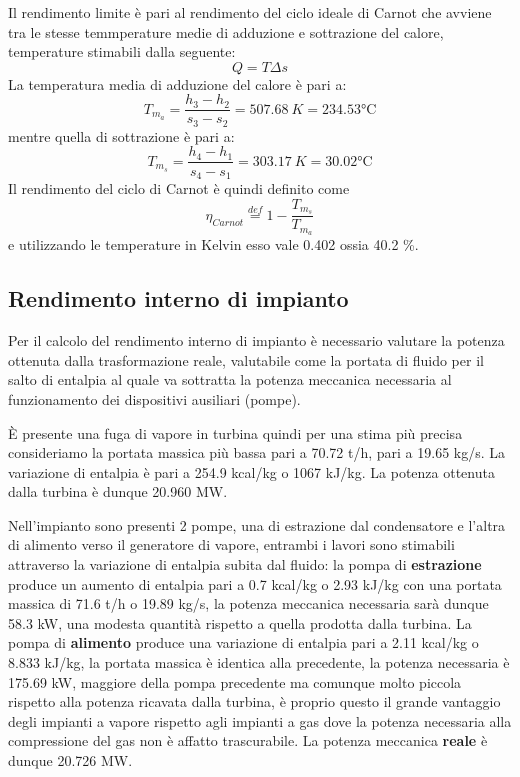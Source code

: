 \documentclass[a4paper,12pt]{article}
\begin{document}
Il rendimento limite è pari al rendimento del ciclo ideale di Carnot che avviene tra le stesse temmperature medie di adduzione e sottrazione
del calore, temperature stimabili dalla seguente:
\begin{equation}
    \label{eq:T_ds}
    Q = T\Delta s
\end{equation}
La temperatura media di adduzione del calore è pari a:
\begin{equation*}
    T_{m_a} = \frac{h_3-h_2}{s_3 - s_2} = 507.68\ K = 234.53 \text{°C}
\end{equation*}
mentre quella di sottrazione è pari a:
\begin{equation*}
    T_{m_s} = \frac{h_4 - h_1}{s_4 - s_1} = 303.17\ K = 30.02 \text{°C}
\end{equation*}
Il rendimento del ciclo di Carnot è quindi definito come
\begin{equation}
    \eta_{Carnot} \stackrel{def}{=} 1 - \frac{T_{m_s}}{T_{m_a}}
\end{equation}
e utilizzando le temperature in Kelvin esso vale 0.402 ossia 40.2 \%.

\subsection{Rendimento interno di impianto}
\label{subsec:rendimento_interno}
Per il calcolo del rendimento interno di impianto è necessario valutare la potenza ottenuta dalla trasformazione reale,
valutabile come la portata di fluido per il salto di entalpia al quale va sottratta la potenza meccanica necessaria al funzionamento
dei dispositivi ausiliari (pompe).

È presente una fuga di vapore in turbina quindi per una stima più precisa consideriamo la portata massica più bassa pari
a 70.72 t/h, pari a 19.65 kg/s. La variazione di entalpia è pari a 254.9 kcal/kg o 1067 kJ/kg.
La potenza ottenuta dalla turbina è dunque 20.960 MW.

Nell'impianto sono presenti 2 pompe, una di estrazione dal condensatore e l'altra di alimento verso il generatore
di vapore, entrambi i lavori sono stimabili attraverso la variazione di entalpia subita dal fluido:
la pompa di \textbf{estrazione} produce un aumento di entalpia pari a 0.7 kcal/kg o 2.93 kJ/kg con una portata massica di
71.6 t/h o 19.89 kg/s, la potenza meccanica necessaria sarà dunque 58.3 kW, una modesta quantità rispetto a quella prodotta dalla turbina.
La pompa di \textbf{alimento} produce una variazione di entalpia pari a 2.11 kcal/kg o 8.833 kJ/kg, la portata massica è identica
alla precedente, la potenza necessaria è 175.69 kW, maggiore della pompa precedente ma comunque molto piccola rispetto alla potenza
ricavata dalla turbina, è proprio questo il grande vantaggio degli impianti a vapore rispetto agli impianti a gas dove la potenza
necessaria alla compressione del gas non è affatto trascurabile.
La potenza meccanica \textbf{reale} è dunque 20.726 MW.
\end{document}

